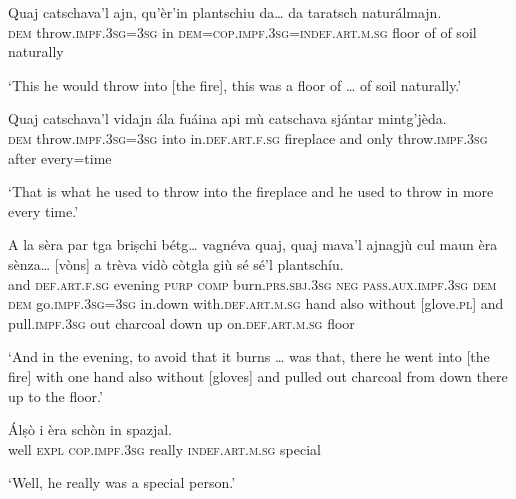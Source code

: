 \begin{linenumbers}
\gll Quaj catschava’l ajn, qu’èr’in plantschiu da… da taratsch naturálmajn.   \\
 \textsc{dem} throw.\textsc{impf.3sg=3sg} in \textsc{dem=cop.impf.3sg=indef.art.m.sg} floor of of soil naturally  \\
\end{linenumbers}
\medskip
\glt `This he would throw into [the fire], this was a floor of … of soil naturally.'
\medskip

\begin{linenumbers}
\gll Quaj catschava’l vidajn ála fuáina api mù catschava sjántar mintg’jèda.   \\
 \textsc{dem} throw.\textsc{impf.3sg=3sg} into in.\textsc{def.art.f.sg} fireplace and only throw.\textsc{impf.3sg} after every=time  \\
\end{linenumbers}
\medskip
\glt `That is what he used to throw into the fireplace and he used to throw in more every time.'
\medskip
 
\begin{linenumbers}
\gll  A la sèra par tga briṣchi bétg… vagnéva quaj, quaj mava’l ajnagjù cul maun èra sènza… [vòns] a trèva vidò còtgla giù sé sé’l plantschíu.  \\
and  \textsc{def.art.f.sg} evening  \textsc{purp} \textsc{comp} burn.\textsc{prs.sbj.3sg} \textsc{neg} \textsc{pass.aux.impf.3sg} \textsc{dem} \textsc{dem} go.\textsc{impf.3sg=3sg} in.down with.\textsc{def.art.m.sg} hand also without [glove.\textsc{pl}] and pull.\textsc{impf.3sg} out charcoal down up on.\textsc{def.art.m.sg} floor  \\
\end{linenumbers}
\medskip
\glt `And in the evening, to avoid that it burns … was that, there he went into [the fire] with one hand also without [gloves] and pulled out charcoal from down there up to the floor.'
\medskip

\begin{linenumbers}
\gll Álṣò i èra schòn in spazjal.    \\
well \textsc{expl} \textsc{cop.impf.3sg} really \textsc{indef.art.m.sg}  special \\
\end{linenumbers}
\medskip
\glt `Well, he really was a special person.'
\medskip 

